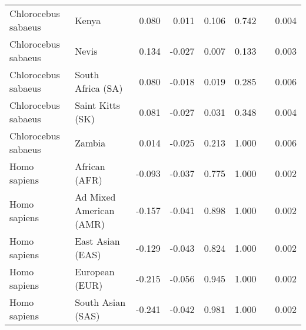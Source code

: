 \begin{center}
\begin{adjustbox}{width = 1\textwidth}
\begin{tabular}{|l|l|r|r|r|r|r|}
 Chlorocebus sabaeus &                           Kenya &                 0.080 &                                0.011 &                0.106 &                                  0.742~~ &              0.004 \\
 Chlorocebus sabaeus &                           Nevis &                 0.134 &                               -0.027 &                0.007 &                                  0.133~~ &              0.003 \\
 Chlorocebus sabaeus &               South Africa (SA) &                 0.080 &                               -0.018 &                0.019 &                                  0.285~~ &              0.006 \\
 Chlorocebus sabaeus &                Saint Kitts (SK) &                 0.081 &                               -0.027 &                0.031 &                                  0.348~~ &              0.004 \\
 Chlorocebus sabaeus &                          Zambia &                 0.014 &                               -0.025 &                0.213 &                                  1.000~~ &              0.006 \\
        Homo sapiens &                   African (AFR) &                -0.093 &                               -0.037 &                0.775 &                                  1.000~~ &              0.002 \\
        Homo sapiens &         Ad Mixed American (AMR) &                -0.157 &                               -0.041 &                0.898 &                                  1.000~~ &              0.002 \\
        Homo sapiens &                East Asian (EAS) &                -0.129 &                               -0.043 &                0.824 &                                  1.000~~ &              0.002 \\
        Homo sapiens &                  European (EUR) &                -0.215 &                               -0.056 &                0.945 &                                  1.000~~ &              0.002 \\
        Homo sapiens &               South Asian (SAS) &                -0.241 &                               -0.042 &                0.981 &                                  1.000~~ &              0.002 \\
\bottomrule
\end{tabular}
\end{adjustbox}
\end{center}
\newpage

